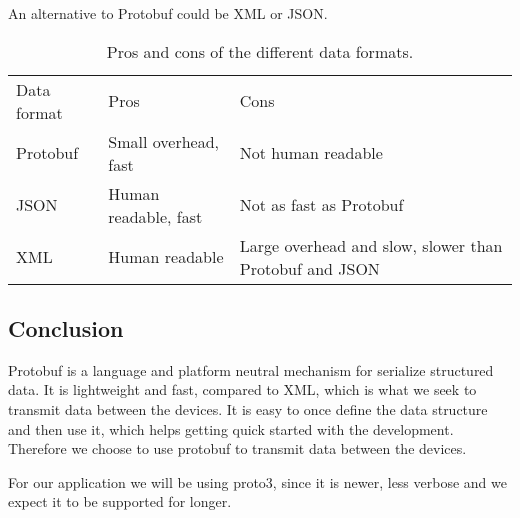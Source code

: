 An alternative to Protobuf could be XML or JSON. 

\begin{table}
    \begin{tabularx}{\textwidth}{XXX}\toprule
        Data format & Pros & Cons \\
        Protobuf    & Small overhead, fast & Not human readable \\
        JSON        & Human readable, fast & Not as fast as Protobuf\\
        XML         & Human readable & Large overhead and slow, slower than Protobuf and JSON \\
    \end{tabularx}
    \label{tab:asdf}
    \caption{Pros and cons of the different data formats.}
\end{table}

\subsection{Conclusion}
Protobuf is a language and platform neutral mechanism for serialize structured data.
It is lightweight and fast, compared to XML, which is what we seek to transmit data between the devices.
It is easy to once define the data structure and then use it, which helps getting quick started with the development.
Therefore we choose to use protobuf to transmit data between the devices.

For our application we will be using proto3, since it is newer, less verbose and we expect it to be supported for longer.
